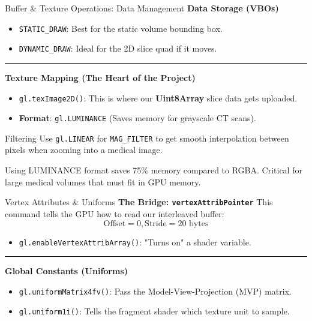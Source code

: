 \begin{frame}{Buffer \& Texture Operations: Data Management}
\textbf{Data Storage (VBOs)}
\begin{itemize}
  \item \texttt{STATIC\_DRAW}: Best for the static volume bounding box.
  \item \texttt{DYNAMIC\_DRAW}: Ideal for the 2D slice quad if it moves.
\end{itemize}

\hrule
\vspace{0.5em}

\textbf{Texture Mapping (The Heart of the Project)}
\begin{itemize}
  \item \texttt{gl.texImage2D()}: This is where our \textbf{Uint8Array} slice data gets uploaded.
  \item \textbf{Format}: \texttt{gl.LUMINANCE} (Saves memory for grayscale CT scans).
\end{itemize}

\begin{exampleblock}{Filtering}
Use \texttt{gl.LINEAR} for \texttt{MAG\_FILTER} to get smooth interpolation between pixels when zooming into a medical image.
\end{exampleblock}

Using LUMINANCE format saves 75\% memory compared to RGBA. Critical for large medical volumes that must fit in GPU memory.
\end{frame}

\begin{frame}{Vertex Attributes \& Uniforms}
\textbf{The Bridge: \texttt{vertexAttribPointer}}
This command tells the GPU how to read our interleaved buffer:
\[ \text{Offset} = 0, \text{Stride} = 20 \text{ bytes} \]

\begin{itemize}
  \item \texttt{gl.enableVertexAttribArray()}: "Turns on" a shader variable.
\end{itemize}

\hrule
\vspace{0.5em}

\textbf{Global Constants (Uniforms)}
\begin{itemize}
  \item \texttt{gl.uniformMatrix4fv()}: Pass the Model-View-Projection (MVP) matrix.
  \item \texttt{gl.uniform1i()}: Tells the fragment shader which texture unit to sample.
\end{itemize}
\end{frame}

